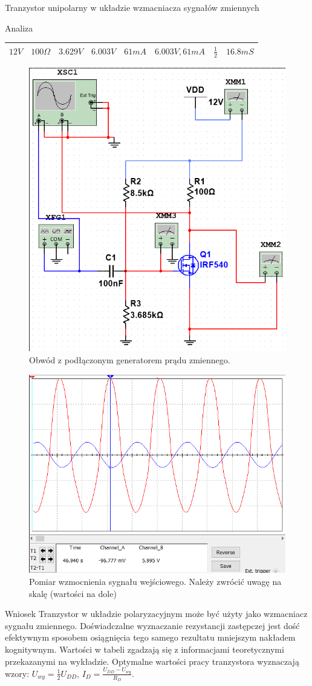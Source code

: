 \documentclass[a4paper]{scrartcl}
\begin{document}
\begin{section}{Tranzystor unipolarny w układzie wzmacniacza sygnałów zmiennych}
\begin{subsection}{Analiza}
\begin{table}[!ht]
\begin{center}
\begin{tabular}{| l | l | l | l | l | l | l | l |}
						$ 12V $ & $ 100 \Omega $ & $ 3.629V $ & $ 6.003 V $ & $ 61 mA$ & $ 6.003 V, 61 mA $ & $ \frac{1}{2} $ & $ 16.8mS$ \\ \hline
					\end{tabular}
					\end{center}
				\end{table}
				\begin{figure}[!ht]
						\begin{center}
							\includegraphics[width=0.4\linewidth,scale=2]{exercise-2-sin-amp-circuit}
							\caption{Obwód z podłączonym generatorem prądu zmiennego.}
							\label{fig:circuit-2-circuit-amp-circ}
						\end{center}
				\end{figure}
				\begin{figure}[!ht]
						\begin{center}
							\includegraphics[width=0.6\linewidth,scale=2]{exercise-2-wzmocnienie-sin}
							\caption{Pomiar wzmocnienia sygnału wejściowego. Należy zwrócić uwagę na skalę (wartości na dole)}
							\label{fig:circuit-2-circuit-amp}
						\end{center}
				\end{figure}
		\end{subsection}
		\pagebreak
		\begin{subsection}{Wniosek}
			Tranzystor w układzie polaryzacyjnym może być użyty jako wzmacniacz sygnału zmiennego. Doświadczalne wyznaczanie rezystancji zastępczej jest dość efektywnym sposobem osiągnięcia tego samego rezultatu mniejszym nakładem kognitywnym. Wartości w tabeli zgadzają się z informacjami teoretycznymi przekazanymi na wykładzie. Optymalne wartości pracy tranzystora wyznaczają wzory: $ U_{wy} = \frac{1}{2}U_{DD} $, $ I_{D} = \frac{U_{DD} - U_{wy}}{R_{D}} $.
		\end{subsection}
	\end{section}
\end{document}
